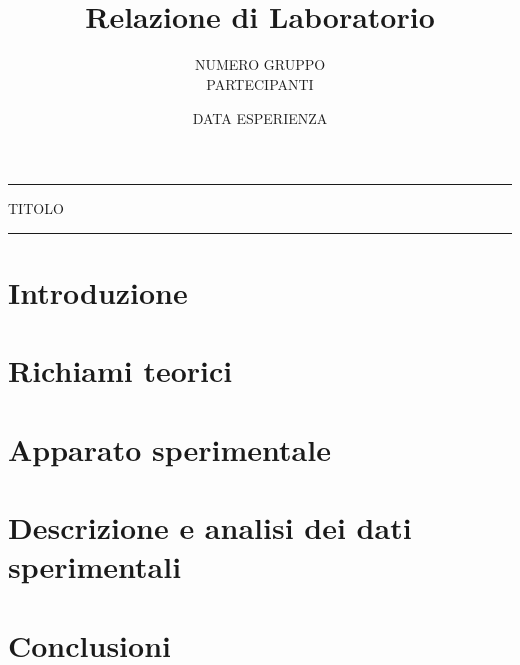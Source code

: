 \documentclass[11pt]{article}
\begin{document}
\setlength{\parindent}{0pt}
\title{\vspace{-4em}{\large Laboratorio di Meccanica e Termodinamica} \\
	Relazione di Laboratorio}
\author{NUMERO GRUPPO \\
	PARTECIPANTI}
\date{DATA ESPERIENZA}
\maketitle

\vspace{-2em}\par\noindent\rule{\textwidth}{0.4pt}
\begin{center}
	{\Large\sc TITOLO}
\end{center}
\par\noindent\rule{\textwidth}{0.4pt}


\section{Introduzione}


\section{Richiami teorici}


\section{Apparato sperimentale}


\section{Descrizione e analisi dei dati sperimentali}


\section{Conclusioni}

\end{document}
